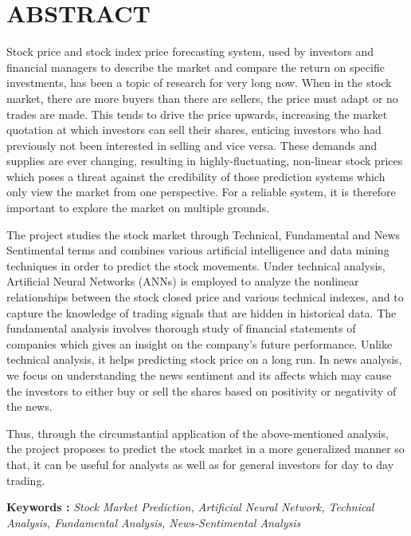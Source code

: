 

{}
\section*{ABSTRACT}

Stock price and stock index price forecasting system, used by investors and financial managers to describe the market and compare the return on specific investments, has been a topic of research for very long now. When in the stock market, there are more buyers than there are sellers, the price must adapt or no trades are made. This tends to drive the price upwards, increasing the market quotation at which investors can sell their shares, enticing investors who had previously not been interested in selling and vice versa. These demands and supplies are ever changing, resulting in highly-fluctuating, non-linear stock prices which poses a threat against the credibility of those prediction systems which only view the market from one perspective. For a reliable system, it is therefore important to explore the market on multiple grounds. 

The project studies the stock market through Technical, Fundamental and News Sentimental terms and combines various artificial intelligence and data mining techniques in order to predict the stock movements. Under technical analysis, Artificial Neural Networks (ANNs) is employed to analyze the nonlinear relationships between the stock closed price and various technical indexes, and to capture the knowledge of trading signals that are hidden in historical data. The fundamental analysis involves thorough study of financial statements of companies which gives an insight on the company's future performance. Unlike technical analysis, it helps predicting stock price on a long run. In news analysis, we focus on understanding the news sentiment and its affects which may cause the investors to either buy or sell the shares based on positivity or negativity of the news.

Thus, through the circumstantial application of the above-mentioned analysis, the project proposes to predict the stock market in a more generalized manner so that, it can be useful for analysts as well as for general investors for day to day trading. 


\textbf{Keywords : }\textit{Stock Market Prediction, Artificial Neural Network, Technical Analysis, Fundamental Analysis, News-Sentimental Analysis}